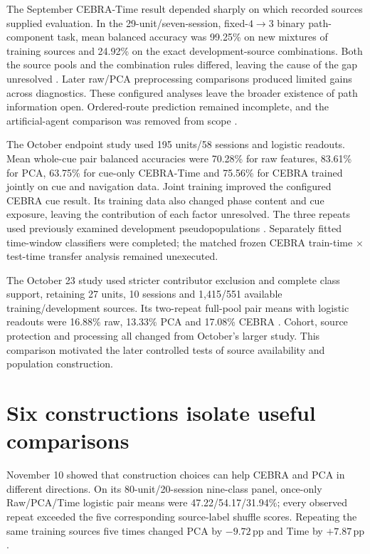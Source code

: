 \documentclass[10pt,a4paper]{article}
\newcommand{\pp}{\,\mathrm{pp}}
\begin{document}
The September CEBRA-Time result depended sharply on which recorded sources supplied evaluation. In the 29-unit/seven-session, fixed-$4\to3$ binary path-component task, mean balanced accuracy was 99.25\% on new mixtures of training sources and 24.92\% on the exact development-source combinations. Both the source pools and the combination rules differed, leaving the cause of the gap unresolved \cite{path}. Later raw/PCA preprocessing comparisons produced limited gains across diagnostics. These configured analyses leave the broader existence of path information open. Ordered-route prediction remained incomplete, and the artificial-agent comparison was removed from scope \cite{history,contract}.

The October endpoint study used 195 units/58 sessions and logistic readouts. Mean whole-cue pair balanced accuracies were 70.28\% for raw features, 83.61\% for PCA, 63.75\% for cue-only CEBRA-Time and 75.56\% for CEBRA trained jointly on cue and navigation data. Joint training improved the configured CEBRA cue result. Its training data also changed phase content and cue exposure, leaving the contribution of each factor unresolved. The three repeats used previously examined development pseudopopulations \cite{endpoint}. Separately fitted time-window classifiers were completed; the matched frozen CEBRA train-time $\times$ test-time transfer analysis remained unexecuted.

The October 23 study used stricter contributor exclusion and complete class support, retaining 27 units, 10 sessions and 1,415/551 available training/development sources. Its two-repeat full-pool pair means with logistic readouts were 16.88\% raw, 13.33\% PCA and 17.08\% CEBRA \cite{fresh}. Cohort, source protection and processing all changed from October's larger study. This comparison motivated the later controlled tests of source availability and population construction.

\clearpage
\section{Six constructions isolate useful comparisons}\label{sec:design}
November 10 showed that construction choices can help CEBRA and PCA in different directions. On its 80-unit/20-session nine-class panel, once-only Raw/PCA/Time logistic pair means were 47.22/54.17/31.94\%; every observed repeat exceeded the five corresponding source-label shuffle scores. Repeating the same training sources five times changed PCA by $-9.72\pp$ and Time by $+7.87\pp$ \cite{support}.
\end{document}
